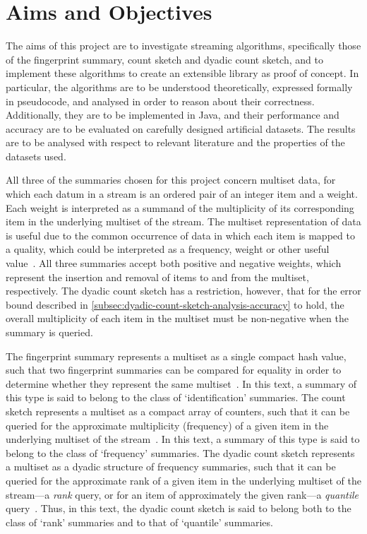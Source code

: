 \section{Aims and Objectives}
\label{sec:introduction-aims}

The aims of this project are to investigate streaming algorithms, specifically those of the fingerprint summary, count sketch and dyadic count sketch, and to implement these algorithms to create an extensible library as proof of concept.
In particular, the algorithms are to be understood theoretically, expressed formally in pseudocode, and analysed in order to reason about their correctness.
Additionally, they are to be implemented in Java, and their performance and accuracy are to be evaluated on carefully designed artificial datasets.
The results are to be analysed with respect to relevant literature and the properties of the datasets used.

All three of the summaries chosen for this project concern multiset data, for which each datum in a stream is an ordered pair of an integer item and a weight.
Each weight is interpreted as a summand of the multiplicity of its corresponding item in the underlying multiset of the stream.
The multiset representation of data is useful due to the common occurrence of data in which each item is mapped to a quality, which could be interpreted as a frequency, weight or other useful value~\citep{singh07}.
All three summaries accept both positive and negative weights, which represent the insertion and removal of items to and from the multiset, respectively.
The dyadic count sketch has a restriction, however, that for the error bound described in \cref{subsec:dyadic-count-sketch-analysis-accuracy} to hold, the overall multiplicity of each item in the multiset must be non-negative when the summary is queried.

The fingerprint summary represents a multiset as a single compact hash value, such that two fingerprint summaries can be compared for equality in order to determine whether they represent the same multiset~\citep{cormode20}.
In this text, a summary of this type is said to belong to the class of `identification' summaries.
The count sketch represents a multiset as a compact array of counters, such that it can be queried for the approximate multiplicity (frequency) of a given item in the underlying multiset of the stream~\citep{charikar02}.
In this text, a summary of this type is said to belong to the class of `frequency' summaries.
The dyadic count sketch represents a multiset as a dyadic structure of frequency summaries, such that it can be queried for the approximate rank of a given item in the underlying multiset of the stream---a \emph{rank} query, or for an item of approximately the given rank---a \emph{quantile} query~\citep{cormode05}.
Thus, in this text, the dyadic count sketch is said to belong both to the class of `rank' summaries and to that of `quantile' summaries.


